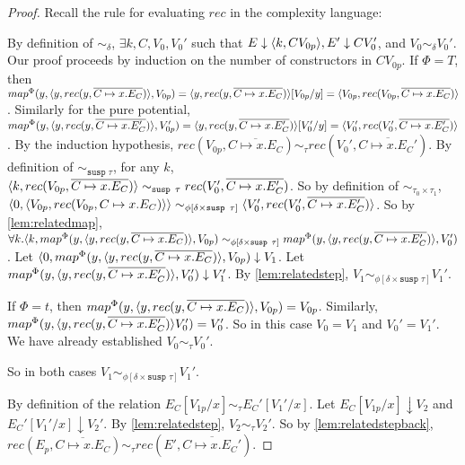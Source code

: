 \begin{proof}
  Recall the rule for evaluating $rec$ in the complexity language:
  \begin{prooftree}
  \end{prooftree}
  By definition of $\sim_\delta$, $\exists k, C, V_0, V_0'$ such that $E \downarrow \LP k, C V_{0p} \RP, E' \downarrow C V_0'$, and $V_0 \sim_\delta V_0'$.
  Our proof proceeds by induction on the number of constructors in $C V_{0p}$.
  If $\Phi = T$, then $map^\Phi(y, \LP y, rec(y, \overline{C \mapsto x.E_C})\RP, V_{0p}) = \LP y, rec(y, \overline{C \mapsto x.E_C})\RP[V_{0p}/y] = \LP V_{0p}, rec(V_{0p}, \overline{C \mapsto x.E_C}) \RP$.
  Similarly for the pure potential, $map^\Phi(y, \LP y, rec(y, \overline{C \mapsto x.E_C'})\RP, V_{0p}') = \LP y, rec(y, \overline{C \mapsto x.E_C'})\RP [V_0'/y] = \LP V_0', rec(V_0', \overline{C \mapsto x.E_C'}) \RP$.
  By the induction hypothesis, $rec(V_{0p}, \overline{C \mapsto x.E_C}) \sim_\tau rec(V_0', \overline{C \mapsto x.E_C'})$.
  By definition of $\sim_{\texttt{susp }\tau}$, for any $k$, $\LP k, rec(V_{0p}, \overline{C \mapsto x.E_C}) \RP \sim_{\texttt{susp }\tau} rec(V_0', \overline{C \mapsto x.E_C'})$.
  So by definition of $\sim_{\tau_0 \times \tau_1}$, $\LP 0, \LP V_{0p}, rec(V_{0p}, C \mapsto x.E_C) \RP\RP \sim_{\phi[\delta \times \texttt{susp }\tau]} \LP V_0', rec(V_0', \overline{C \mapsto x.E_C'})\RP$.
  So by \ref{lem:relatedmap}, $\forall k. \LP k, map^\Phi(y, \LP y, rec(y, \overline{C \mapsto x.E_C})\RP, V_{0p}) \sim_{\phi[\delta \times \texttt{susp }\tau]} map^\Phi(y, \LP y, rec(y, \overline{C \mapsto x.E_C'}) \RP, V_0')$.
  Let $\LP 0, map^\Phi(y, \LP y, rec(y, \overline{C \mapsto x.E_C})\RP, V_{0p}) \downarrow V_1$.
  Let $map^\Phi(y, \LP y, rec(y, \overline{C \mapsto x.E_C'}) \RP, V_0') \downarrow V_1'$.
  By \ref{lem:relatedstep}, $V_1 \sim_{\phi[\delta \times \texttt{susp }\tau]} V_1'$.

  If $\Phi = t$, then $map^\Phi(y, \LP y, rec(y, \overline{C \mapsto x.E_C})\RP, V_{0p}) = V_{0p}$.
  Similarly, $map^\Phi(y, \LP y, rec(y, \overline{C \mapsto x.E_C'})\RP V_0') = V_0'$.
  So in this case $V_0 = V_1$ and $V_0' = V_1'$.
  We have already established $V_0 \sim_\tau V_0'$.

  So in both cases $V_1 \sim_{\phi[\delta \times \texttt{susp }\tau]} V_1'$.

  By definition of the relation $E_C[V_{1p}/x] \sim_\tau E_C'[V_1'/x]$.
  Let $E_C[V_{1p}/x] \downarrow V_2$ and $E_C'[V_1'/x] \downarrow V_2'$.
  By \ref{lem:relatedstep}, $V_2 \sim_\tau V_2'$.
  So by \ref{lem:relatedstepback}, $rec(E_p, \overline{C \mapsto x.E_C}) \sim_\tau rec(E', \overline{C \mapsto x.E_C'})$.
\end{proof}
